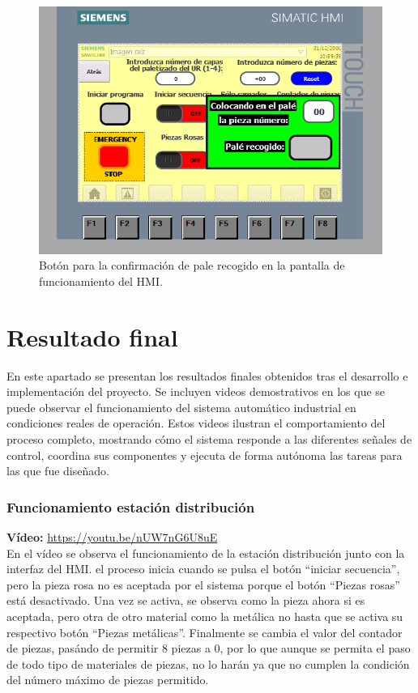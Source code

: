 \begin{figure}[h!]
  \begin{center}
  	\includegraphics[width=12cm]{figs/HMI_funcionamiento_UR_recoger}
  \end{center}
  \caption{\centering Botón para la confirmación de pale recogido en la pantalla de funcionamiento del HMI.}
  \label{fig:HMI_funcionamiento_UR_recoger}
\end{figure}


\section{Resultado final}
\label{sec:resultado_final}

En este apartado se presentan los resultados finales obtenidos tras el desarrollo e implementación del proyecto. Se incluyen videos demostrativos en los que se puede observar el funcionamiento del sistema automático industrial en condiciones reales de operación. Estos videos ilustran el comportamiento del proceso completo, mostrando cómo el sistema responde a las diferentes señales de control, coordina sus componentes y ejecuta de forma autónoma las tareas para las que fue diseñado.

\subsubsection{Funcionamiento estación distribución}

\textbf{Vídeo:} \url{https://youtu.be/nUW7nG6U8uE} \\

En el vídeo se observa el funcionamiento de la estación distribución junto con la interfaz del HMI. el proceso inicia cuando se pulsa el botón ``iniciar secuencia'', pero la pieza rosa no es aceptada por el sistema porque el botón ``Piezas rosas'' está desactivado. Una vez se activa, se observa como la pieza ahora si es aceptada, pero otra de otro material como la metálica no hasta que se activa su respectivo botón ``Piezas metálicas''. Finalmente se cambia el valor del contador de piezas, pasándo de permitir 8 piezas a 0, por lo que aunque se permita el paso de todo tipo de materiales de piezas, no lo harán ya que no cumplen la condición del número máximo de piezas permitido.

